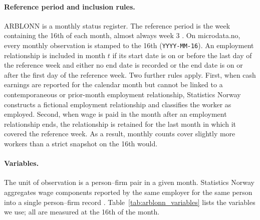 \documentclass[12pt]{article}
\begin{document}
\paragraph{Reference period and inclusion rules.}
ARBLONN is a monthly status register. The reference period is the week containing the 16th of each month, almost always week 3 \citep{ssb_klassifisering}. On microdata.no, every monthly observation is stamped to the 16th (\texttt{YYYY-MM-16}). An employment relationship is included in month $t$ if its start date is on or before the last day of the reference week and either no end date is recorded or the end date is on or after the first day of the reference week. Two further rules apply. First, when cash earnings are reported for the calendar month but cannot be linked to a contemporaneous or prior-month employment relationship, Statistics Norway constructs a fictional employment relationship and classifies the worker as employed. Second, when wage is paid in the month after an employment relationship ends, the relationship is retained for the last month in which it covered the reference week. As a result, monthly counts cover slightly more workers than a strict snapshot on the 16th would.

\paragraph{Variables.}
The unit of observation is a person--firm pair in a given month. Statistics Norway aggregates wage components reported by the same employer for the same person into a single person--firm record \citep{ssb_klassifisering}. Table~\ref{tab:arblonn_variables} lists the variables we use; all are measured at the 16th of the month.
\end{document}
